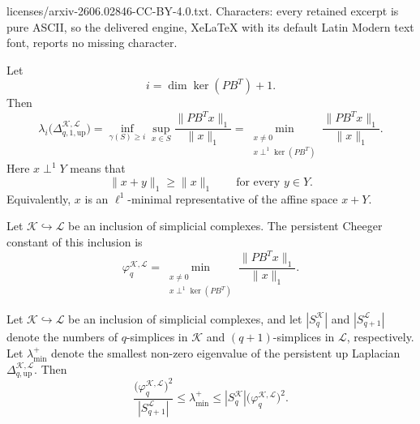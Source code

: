\documentclass[10pt,a4paper]{amsart}
\newcommand{\KK}{\mathcal{K}}
\newcommand{\LL}{\mathcal{L}}
\begin{document}
licenses/arxiv-2606.02846-CC-BY-4.0.txt. Characters: every retained excerpt is pure ASCII, so the delivered engine, XeLaTeX with its default Latin Modern text font, reports no missing character.
\begin{lemma}
\label{lem:p1cheeger_equiv}
Let
\[
i=\dim\ker(PB^T)+1.
\]
Then
\[
\lambda_i\bigl(\Delta_{q,1,\mathrm{up}}^{\KK,\LL}\bigr)
=
\inf_{\gamma(S)\geq i}
\sup_{x\in S}
\frac{\|PB^T x\|_1}{\|x\|_1}
=
\min_{\substack{x\neq 0\\ x\perp^1\ker(PB^T)}}
\frac{\|PB^T x\|_1}{\|x\|_1}.
\]
Here \(x\perp^1 Y\) means that
\[
\|x+y\|_1\geq \|x\|_1
\qquad
\text{for every } y\in Y.
\]
Equivalently, \(x\) is an \(\ell^1\)-minimal representative of the affine
space \(x+Y\).
\end{lemma}

\begin{definition}\label{def:nonzero_cheeger}
Let \(\KK\hookrightarrow \LL\) be an inclusion of simplicial complexes. The
persistent Cheeger constant of this inclusion is
\[
\varphi_q^{\KK,\LL}
=
\min_{\substack{x\neq 0\\ x\perp^1\ker(PB^T)}}
\frac{\|PB^T x\|_1}{\|x\|_1}.
\]
\end{definition}

\begin{proposition}\label{prop_cheeger_ineq}
Let \(\KK\hookrightarrow \LL\) be an inclusion of simplicial complexes, and
let \(|S_q^\KK|\) and \(|S_{q+1}^\LL|\) denote the numbers of \(q\)-simplices
in \(\KK\) and \((q+1)\)-simplices in \(\LL\), respectively. Let
\(\lambda_{\min}^+\) denote the smallest non-zero eigenvalue of
the persistent up Laplacian \(\Delta_{q,\mathrm{up}}^{\KK,\LL}\). Then
\begin{equation}\label{ineq:persistent_cheeger}
\frac{\bigl(\varphi_q^{\KK,\LL}\bigr)^2}{|S_{q+1}^{\LL}|}
\leq
\lambda_{\min}^+
\leq
|S_q^\KK|\bigl(\varphi_q^{\KK,\LL}\bigr)^2 .
\end{equation}
\end{proposition}
\end{document}
